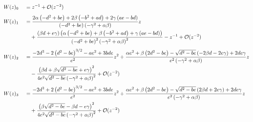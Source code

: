 \begin{sheetasymptotics}
    \begin{align*}
        \sheetlabel{W(z)_{0}} & ={}z^{-1}+\mathcal O(z^{-2}) \\[4pt]
        \sheetlabel{W(z)_{1}} & ={}\frac{2 \alpha \left(- d^{2} + b e\right) + 2 \beta \left(- b^{2} + a d\right) + 2 \gamma \left(a e - b d\right)}{\left(- d^{2} + b e\right) \left(- \gamma^{2} + \alpha \beta\right)}z \\*
                              & \quad{}+\frac{\left(\beta d + e \gamma\right) \left(\alpha \left(- d^{2} + b e\right) + \beta \left(- b^{2} + a d\right) + \gamma \left(a e - b d\right)\right)}{\left(- d^{2} + b e\right)^{2} \left(- \gamma^{2} + \alpha \beta\right)^{2}}-z^{-1}+\mathcal O(z^{-2}) \\[4pt]
        \sheetlabel{W(z)_{2}} & ={}\frac{- 2 d^{3} - 2 \left(d^{2} - b e\right)^{3/2} - a e^{2} + 3 b d e}{e^{2}}z^{2}+\frac{\alpha e^{2} + \beta \left(2 d^{2} - b e\right) - \sqrt{d^{2} - b e} \left(- 2 \beta d - 2 e \gamma\right) + 2 d e \gamma}{e^{2} \left(- \gamma^{2} + \alpha \beta\right)}z \\*
                              & \quad{}-\frac{\left(\beta d + \beta \sqrt{d^{2} - b e} + e \gamma\right)^{2}}{4 e^{2} \sqrt{d^{2} - b e} \left(- \gamma^{2} + \alpha \beta\right)^{2}}+\mathcal O(z^{-2}) \\[4pt]
        \sheetlabel{W(z)_{3}} & ={}\frac{- 2 d^{3} + 2 \left(d^{2} - b e\right)^{3/2} - a e^{2} + 3 b d e}{e^{2}}z^{2}+\frac{\alpha e^{2} + \beta \left(2 d^{2} - b e\right) - \sqrt{d^{2} - b e} \left(2 \beta d + 2 e \gamma\right) + 2 d e \gamma}{e^{2} \left(- \gamma^{2} + \alpha \beta\right)}z \\*
                              & \quad{}+\frac{\left(\beta \sqrt{d^{2} - b e} - \beta d - e \gamma\right)^{2}}{4 e^{2} \sqrt{d^{2} - b e} \left(- \gamma^{2} + \alpha \beta\right)^{2}}+\mathcal O(z^{-2})
    \end{align*}
\end{sheetasymptotics}

